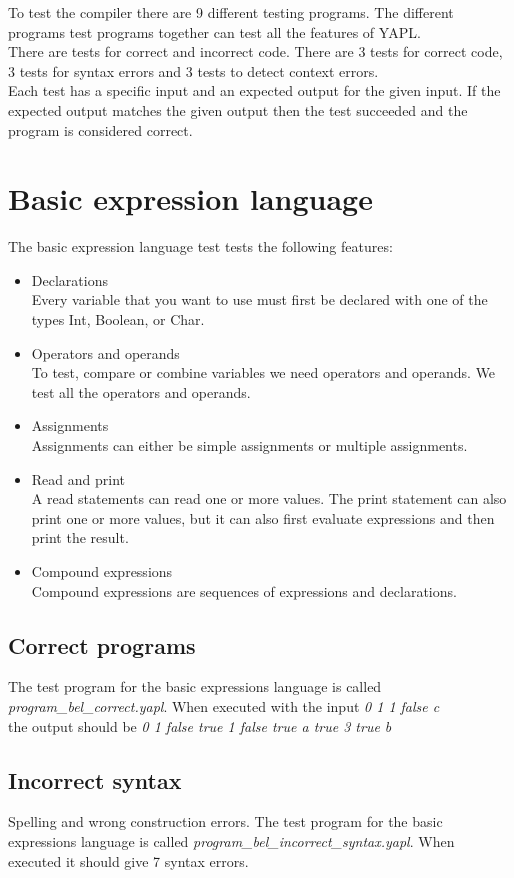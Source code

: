 To test the compiler there are 9 different testing programs. The different programs test programs together can test all the features of YAPL.\\
There are tests for correct and incorrect code. There are 3 tests for correct code, 3 tests for syntax errors and 3 tests to detect context errors.\\
Each test has a specific input and an expected output for the given input. If the expected output matches the given output then the test succeeded and the program is considered correct.

\section{Basic expression language}
The basic expression language test tests the following features:
\begin{itemize}
\item Declarations \\
	Every variable that you want to use must first be declared with one of the types Int, Boolean, or Char.
\item Operators and operands \\
	To test, compare or combine variables we need operators and operands. We test all the operators and operands.
\item Assignments \\
	Assignments can either be simple assignments or multiple assignments. 
\item Read and print \\
	A read statements can read one or more values. The print statement can also print one or more values, but it can also first evaluate expressions and then print the result.
\item Compound expressions \\
	Compound expressions are sequences of expressions and declarations. 
\end{itemize}
\subsection{Correct programs}
The test program for the basic expressions language is called \emph{program_bel_correct.yapl}. When executed with the input \emph{0 1 1 false c} \\the output should be \emph{0 1 false true 1 false true a true 3 true b}
\subsection{Incorrect syntax}
Spelling and wrong construction errors.
The test program for the basic expressions language is called \emph{program_bel_incorrect_syntax.yapl}. When executed it should give 7 syntax errors.
